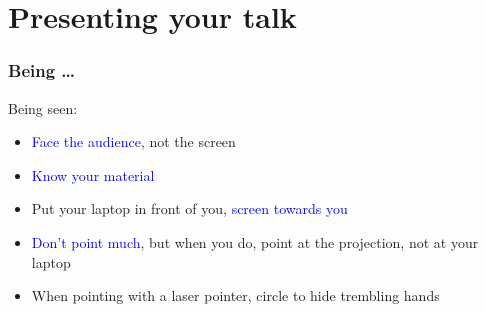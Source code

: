 \documentclass[aspectratio=43,10pt,ucs]{beamer} %
\begin{document}
\section{Presenting your talk}
\begin{frame}
  \frametitle{Being …}

  \alert{Being seen:}
  \begin{itemize}
  \item \textcolor{blue}{Face the audience}, not the screen
  \item \textcolor{blue}{Know your material}
  \item Put your laptop in front of you, \textcolor{blue}{screen
      towards you}
  \item \textcolor{blue}{Don't point much}, but when you do, point at
    the projection, not at your laptop
  \item When pointing with a laser pointer, circle to hide trembling
    hands
  \end{itemize}

  \vspace*{1em}


\end{frame}
\end{document}
